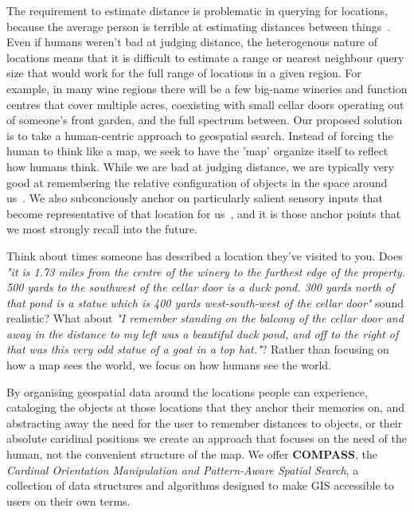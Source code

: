 \par{The requirement to estimate distance is problematic in querying for locations, because the average person is terrible at estimating distances between things~\cite{Schwering2014}. 
Even if humans weren't bad at judging distance, the heterogenous nature of locations means that it is difficult to estimate a range or nearest neighbour query size that would work for the full range of locations in a given region. 
For example, in many wine regions there will be a few big-name wineries and function centres that cover multiple acres, coexisting with small cellar doors operating out of someone's front garden, and the full spectrum between. 
Our proposed solution is to take a human-centric approach to geospatial search.
Instead of forcing the human to think like a map, we seek to have the 'map' organize itself to reflect how humans think. 
While we are bad at judging distance, we are typically very good at remembering the relative configuration of objects in the space around us~\cite{Schwering2014}.
We also subconciously anchor on particularly salient sensory inputs that become representative of that location for us~\cite{Weisberg2016, Miller2013, Keatley2021}, and it is those anchor points that we most strongly recall into the future.}
% 
\par{Think about times someone has described a location they've visited to you.
Does \textit{"it is 1.73 miles from the centre of the winery to the furthest edge of the property. 500 yards to the southwest of the cellar door is a duck pond. 300 yards north of that pond is a statue which is 400 yards west-south-west of the cellar door"} sound realistic?
What about \textit{"I remember standing on the balcony of the cellar door and away in the distance to my left was a beautiful duck pond, and off to the right of that was this very odd statue of a goat in a top hat."}?
Rather than focusing on how a map sees the world, we focus on how humans see the world.}
%
\par{By organising geospatial data around the locations people can experience, cataloging the objects at those locations that they anchor their memories on, and abstracting away the need for the user to remember distances to objects, or their absolute caridinal positions we create an approach that focuses on the need of the human, not the convenient structure of the map. 
We offer \textbf{COMPASS}, the \textit{Cardinal Orientation Manipulation and Pattern-Aware Spatial Search}, a collection of data structures and algorithms designed to make GIS accessible to users on their own terms.}

